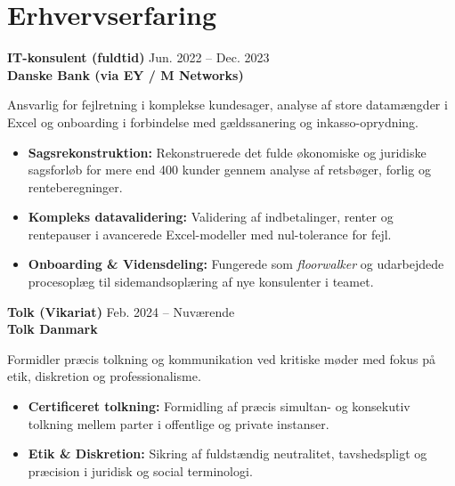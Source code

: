 \documentclass[9.5pt,a4paper]{article}
\begin{document}
\section{Erhvervserfaring}

\textbf{\fontsize{9.5}{12}\selectfont IT-konsulent (fuldtid)} \hfill {\fontsize{8.5}{11}\selectfont\color{mutedgray}Jun. 2022 -- Dec. 2023} \\
{\fontsize{8.5}{11}\selectfont\textbf{\color{accent}Danske Bank (via EY / M Networks)}} \\[2pt]
{\fontsize{8.5}{11}\selectfont\color{darkslate}
Ansvarlig for fejlretning i komplekse kundesager, analyse af store datamængder i Excel og onboarding i forbindelse med gældssanering og inkasso-oprydning.
\begin{itemize}
    \item \textbf{Sagsrekonstruktion:} Rekonstruerede det fulde økonomiske og juridiske sagsforløb for mere end 400 kunder gennem analyse af retsbøger, forlig og renteberegninger.
    \item \textbf{Kompleks datavalidering:} Validering af indbetalinger, renter og rentepauser i avancerede Excel-modeller med nul-tolerance for fejl.
    \item \textbf{Onboarding \& Vidensdeling:} Fungerede som \textit{floorwalker} og udarbejdede procesoplæg til sidemandsoplæring af nye konsulenter i teamet.
\end{itemize}
}

\vspace{3pt}

\textbf{\fontsize{9.5}{12}\selectfont Tolk (Vikariat)} \hfill {\fontsize{8.5}{11}\selectfont\color{mutedgray}Feb. 2024 -- Nuværende} \\
{\fontsize{8.5}{11}\selectfont\textbf{\color{accent}Tolk Danmark}} \\[2pt]
{\fontsize{8.5}{11}\selectfont\color{darkslate}
Formidler præcis tolkning og kommunikation ved kritiske møder med fokus på etik, diskretion og professionalisme.
\begin{itemize}
    \item \textbf{Certificeret tolkning:} Formidling af præcis simultan- og konsekutiv tolkning mellem parter i offentlige og private instanser.
    \item \textbf{Etik \& Diskretion:} Sikring af fuldstændig neutralitet, tavshedspligt og præcision i juridisk og social terminologi.
\end{itemize}
}
\end{document}
